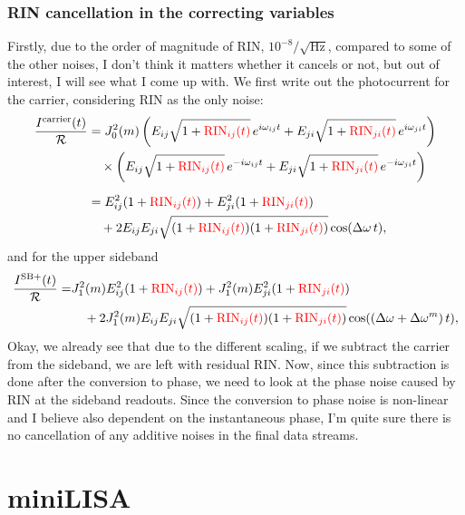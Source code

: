 \documentclass[11pt]{article}
\begin{document}
\subsubsection{RIN cancellation in the correcting variables}
Firstly, due to the order of magnitude of RIN, $10^{-8}/\sqrt{\text{Hz}}$, compared to some of the other noises, I don't think it matters whether it cancels or not, but out of interest, I will see what I come up with. We first write out the photocurrent for the carrier, considering RIN as the only noise:
\begin{align*}
\frac{I^{\text{carrier}}(t)}{\mathcal{R}} &= J^2_0(m)\left(E_{ij}\sqrt{1+{\color{red}\text{RIN}_{ij}(t)}}\,e^{i\omega_{ij} t} + E_{ji}\sqrt{1+{\color{red}\text{RIN}_{ji}(t)}}\,e^{i\omega_{ji} t}\right)\\
&\quad\times\left(E_{ij}\sqrt{1+{\color{red}\text{RIN}_{ij}(t)}}\,e^{-i\omega_{ij} t} + E_{ji}\sqrt{1+{\color{red}\text{RIN}_{ji}(t)}}\,e^{-i\omega_{ji} t}\right) \\[6pt]
&= E_{ij}^2(1+{\color{red}\text{RIN}_{ij}(t)}) + E_{ji}^2(1+{\color{red}\text{RIN}_{ji}(t)})\\
&\quad + 2E_{ij}E_{ji}\sqrt{(1+{\color{red}\text{RIN}_{ij}(t)})(1+{\color{red}\text{RIN}_{ji}(t)})}\cos(\Delta\omega\, t),
\end{align*}
and for the upper sideband
\begin{align*}
\frac{I^{\text{SB}+}(t)}{\mathcal{R}} = &J^2_1(m)E_{ij}^2(1+{\color{red}\text{RIN}_{ij}(t)}) +J^2_1(m) E_{ji}^2(1+{\color{red}\text{RIN}_{ji}(t)})\\
&\quad + 2J^2_1(m)E_{ij}E_{ji}\sqrt{(1+{\color{red}\text{RIN}_{ij}(t)})(1+{\color{red}\text{RIN}_{ji}(t)})}\cos((\Delta\omega + \Delta\omega^m)\, t),
\end{align*}
Okay, we already see that due to the different scaling, if we subtract the carrier from the sideband, we are left with residual RIN. Now, since this subtraction is done after the conversion to phase, we need to look at the phase noise caused by RIN at the sideband readouts. Since the conversion to phase noise is non-linear and I believe also dependent on the instantaneous phase, I'm quite sure there is no cancellation of any additive noises in the final data streams.


\section{miniLISA}
\end{document}
